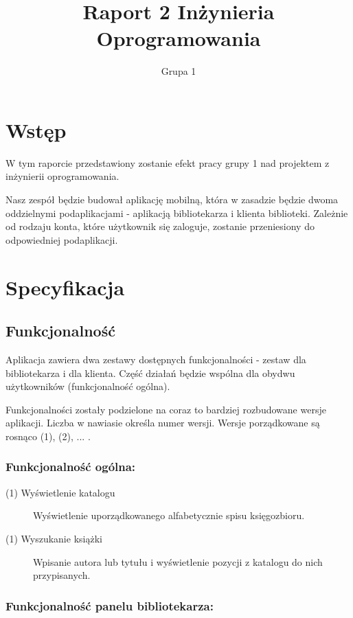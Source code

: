 \documentclass[]{report}
\title{Raport 2 Inżynieria Oprogramowania}
\author{Grupa 1}
\begin{document}
\maketitle
\tableofcontents
\newpage
\section{Wstęp}

W tym raporcie przedstawiony zostanie efekt pracy grupy 1 nad projektem z inżynierii oprogramowania.

Nasz zespół będzie budował aplikację mobilną, która w zasadzie będzie dwoma oddzielnymi podaplikacjami - aplikacją bibliotekarza i klienta biblioteki. Zależnie od rodzaju konta, które użytkownik się zaloguje, zostanie przeniesiony do odpowiedniej podaplikacji.

\newpage
\section{Specyfikacja}

\subsection{Funkcjonalność}

Aplikacja zawiera dwa zestawy dostępnych funkcjonalności - zestaw dla bibliotekarza i dla klienta. Część działań będzie wspólna dla obydwu użytkowników (funkcjonalność ogólna).

Funkcjonalności zostały podzielone na coraz to bardziej rozbudowane wersje aplikacji. Liczba w nawiasie określa numer wersji. Wersje porządkowane są rosnąco (1), (2), ... .

\subsubsection{Funkcjonalność ogólna:}

\begin{description}
    \item[(1) Wyświetlenie katalogu]  Wyświetlenie uporządkowanego alfabetycznie spisu księgozbioru.
    \item[(1) Wyszukanie książki]
    Wpisanie autora lub tytułu i wyświetlenie pozycji z katalogu do nich przypisanych.
\end{description}

\subsubsection{Funkcjonalność panelu bibliotekarza:}
\end{document}
